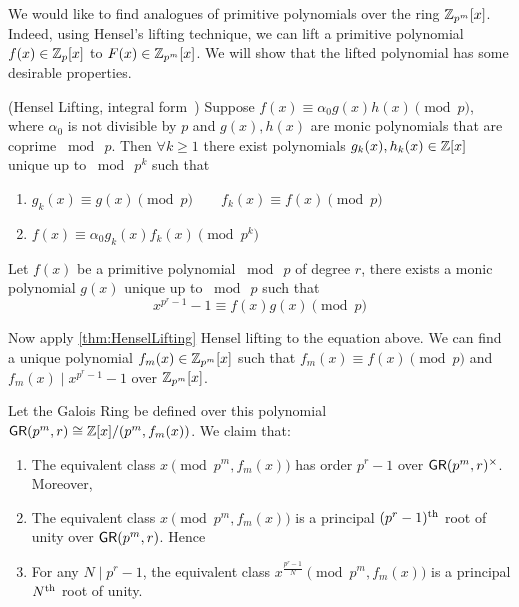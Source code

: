 We would like to find analogues of primitive polynomials over the ring \(\mathbb{Z}_{p^m}[x]\). Indeed, using Hensel's lifting technique, we can lift a primitive polynomial \(f(x) \in \mathbb{Z}_p[x]\) to \(F(x) \in \mathbb{Z}_{p^m}[x]\). We will show that the lifted polynomial has some desirable properties.
\begin{theorem}{(Hensel Lifting, integral form~\cite{MISC:WikiHensel})} \label{thm:HenselLifting}
    Suppose \(f(x) \equiv \alpha_0 g(x) h(x) \pmod{p}\), where \(\alpha_0\) is not divisible by \(p\) and \(g(x), h(x)\) are monic polynomials that are coprime \(\bmod \  p\). Then \(\forall k \ge 1\) there exist polynomials \(g_k(x), h_k(x) \in \mathbb{Z}[x]\) unique up to \(\bmod \  p^k\) such that
    \begin{enumerate}
        \item \(g_k(x) \equiv g(x) \pmod{p} \qquad f_k(x) \equiv f(x) \pmod{p}\)
        \item \(f(x) \equiv \alpha_0 g_k(x) f_k(x) \pmod{p^k}\)
    \end{enumerate}
\end{theorem}
\begin{proposition} \label{prop:LiftedPrimPoly}
    Let \(f(x)\) be a primitive polynomial \(\bmod \  p\) of degree \(r\), there exists a monic polynomial \(g(x)\) unique up to \(\bmod \  p\) such that
    \[x^{p^r - 1} - 1 \equiv f(x) g(x) \pmod{p}\]

    Now apply \cref{thm:HenselLifting} Hensel lifting to the equation above. We can find a unique polynomial \(f_m(x) \in \mathbb{Z}_{p^m}[x]\) such that \(f_m(x) \equiv f(x) \pmod{p}\) and \(f_m(x) \mid x^{p^r - 1} - 1\) over \(\mathbb{Z}_{p^m}[x]\).

    Let the Galois Ring be defined over this polynomial \(\mathsf{GR}(p^m, r) \cong \mathbb{Z}[x] / (p^m, f_m(x))\). We claim that:
    \begin{enumerate}
        \item The equivalent class \(x \pmod{p^m, f_m(x)}\) has order \(p^r - 1\) over \(\mathsf{GR}(p^m, r)^{\times}\). Moreover,
        \item The equivalent class \(x \pmod{p^m, f_m(x)}\) is a principal \((p^r - 1)\textsuperscript{th}\) root of unity over \(\mathsf{GR}(p^m, r)\). Hence
        \item For any \(N \mid p^r - 1\), the equivalent class \(x^{\frac{p^r - 1}{N}} \pmod{p^m, f_m(x)}\) is a principal \(N\textsuperscript{th}\) root of unity.
    \end{enumerate}
\end{proposition}
